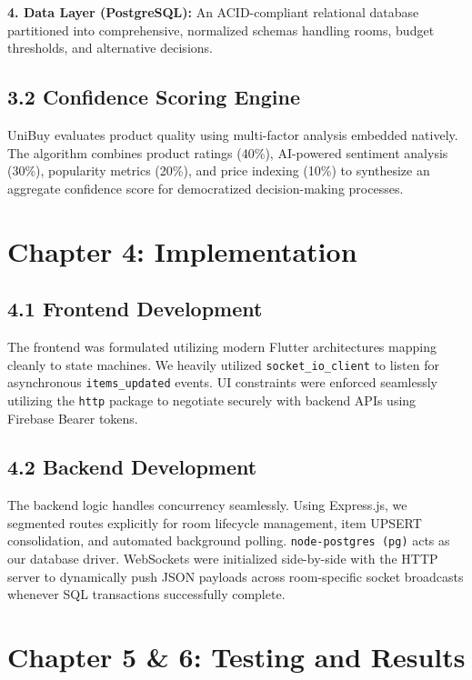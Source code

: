 \documentclass[a4paper,12pt]{article}
\begin{document}
\textbf{4. Data Layer (PostgreSQL):} An ACID-compliant relational database partitioned into comprehensive, normalized schemas handling rooms, budget thresholds, and alternative decisions.

\subsection*{3.2 Confidence Scoring Engine}
UniBuy evaluates product quality using multi-factor analysis embedded natively. The algorithm combines product ratings (40\%), AI-powered sentiment analysis (30\%), popularity metrics (20\%), and price indexing (10\%) to synthesize an aggregate confidence score for democratized decision-making processes.

\newpage
\section*{Chapter 4: Implementation}

\subsection*{4.1 Frontend Development}
The frontend was formulated utilizing modern Flutter architectures mapping cleanly to state machines. We heavily utilized \texttt{socket\_io\_client} to listen for asynchronous \texttt{items\_updated} events. UI constraints were enforced seamlessly utilizing the \texttt{http} package to negotiate securely with backend APIs using Firebase Bearer tokens.

\subsection*{4.2 Backend Development}
The backend logic handles concurrency seamlessly. Using Express.js, we segmented routes explicitly for room lifecycle management, item UPSERT consolidation, and automated background polling. \texttt{node-postgres (pg)} acts as our database driver. WebSockets were initialized side-by-side with the HTTP server to dynamically push JSON payloads across room-specific socket broadcasts whenever SQL transactions successfully complete.

\newpage
\section*{Chapter 5 \& 6: Testing and Results}
\end{document}
